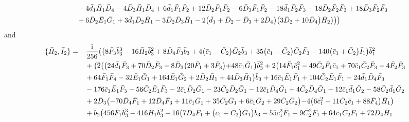 \documentclass[10pt]{amsart}
\theoremstyle{definition}
\theoremstyle{corollary}
\theoremstyle{remark}
\theoremstyle{conclusion}
\begin{document}
\begin{align}
& \hskip 0.7cm+4 \bar{d}_1 \bar{H}_1 \bar{D}_4-4 \bar{D}_3 \bar{H}_1 \bar{D}_4+6 \bar{d}_1 \bar{F}_1 \bar{F}_2+12 \bar{D}_2 \bar{F}_1 \bar{F}_2-6 \bar{D}_3 \bar{F}_1 \bar{F}_2-18 \bar{d}_1 \bar{F}_2 \bar{F}_3-18 \bar{D}_2 \bar{F}_2 \bar{F}_3+18 \bar{D}_3 \bar{F}_2 \bar{F}_3\nonumber \\
& \hskip 0.7cm+6 \bar{D}_2 \bar{E}_1 \bar{G}_1+3 \bar{d}_1 \bar{D}_2 \bar{H}_1-3 \bar{D}_2 \bar{D}_3 \bar{H}_1-2 \bigl(\bar{d}_1+\bar{D}_2-\bar{D}_3+2 \bar{D}_4\bigl) \bigl(3 \bar{D}_2+10 \bar{D}_4\bigl) \bar{H}_2\bigl)\bigl)\bigl)  
\end{align} and 
\begin{align}
\{\bar{H}_2, \bar{I}_2\}&=-\frac{\rm i}{256}  \bigl(\bigl(8 \bar{F}_3\bar{b}_3^3-16 \bar{H}_2 \bar{b}_3^2+8 \bar{D}_4 \bar{F}_3 \bar{b}_3+4 \bigl(\bar{c}_1-\bar{C}_2\bigl) \bar{G}_2 \bar{b}_3+35 \bigl(\bar{c}_1-\bar{C}_2\bigl) \bar{C}_2 \bar{F}_3-140 \bigl(\bar{c}_1+\bar{C}_2\bigl) \bar{I}_1\bigl) \bar{b}_1^2\nonumber \\
& \hskip 0.7cm+\bigl(\bar{2} \bigl(\bigl(24 \bar{d}_1 \bar{F}_3+70 \bar{D}_2 \bar{F}_3-8 \bar{D}_3 \bigl(20 \bar{F}_1+3 \bar{F}_3\bigl)+48 \bar{c}_1 \bar{G}_1\bigl) \bar{b}_3^2+2 \bigl(14 \bar{F}_1 \bar{c}_1^2-49 \bar{C}_2 \bar{F}_1 \bar{c}_1+70 \bar{c}_1\bar{C}_2 \bar{F}_3-4 \bar{F}_2 \bar{F}_3\nonumber \\
& \hskip 0.7cm +64 \bar{F}_1 \bar{F}_4-32 \bar{E}_1 \bar{G}_1+164 \bar{E}_1 \bar{G}_2+2 \bar{D}_2 \bar{H}_1+44 \bar{D}_3 \bar{H}_1\bigl) \bar{b}_3+16 \bar{c}_1 \bar{E}_1 \bar{F}_1+104 \bar{C}_2 \bar{E}_1 \bar{F}_1-24 \bar{d}_1 \bar{D}_4 \bar{F}_3\nonumber  \\
& \hskip 0.7cm -176 \bar{c}_1 \bar{E}_1 \bar{F}_3-56 \bar{C}_2 \bar{E}_1 \bar{F}_3-2 \bar{c}_1 \bar{D}_2 \bar{G}_1-23 \bar{C}_2 \bar{D}_2 \bar{G}_1-12 \bar{c}_1 \bar{D}_4 \bar{G}_1+4 \bar{C}_2 \bar{D}_4 \bar{G}_1-12 \bar{c}_1 \bar{d}_1 \bar{G}_2-58 \bar{C}_2 \bar{d}_1 \bar{G}_2\nonumber \\
& \hskip 0.7cm+2 \bar{D}_3 \bigl(-70 \bar{D}_4 \bar{F}_1+12 \bar{D}_4 \bar{F}_3+11 \bar{c}_1 \bar{G}_1+35 \bar{C}_2 \bar{G}_1+6 \bar{c}_1 \bar{G}_2+29 \bar{C}_2 \bar{G}_2\bigl)-4 \bigl(6 \bar{c}_1^2-11 \bar{C}_2 \bar{c}_1+88 \bar{F}_4\bigl) \bar{H}_1\bigl) \nonumber \\
& \hskip 0.7cm+\bar{b}_2 \bigl(456 \bar{F}_1 \bar{b}_3^3-416 \bar{H}_1 \bar{b}_3^2-16 \bigl(7 \bar{D}_4 \bar{F}_1+\bigl(\bar{c}_1-\bar{C}_2\bigl) \bar{G}_1\bigl) \bar{b}_3-55 \bar{c}_1^2 \bar{F}_1-9 \bar{C}_2^2 \bar{F}_1+64 \bar{c}_1 \bar{C}_2 \bar{F}_1+72 \bar{D}_4 \bar{H}_1\nonumber \\

\end{align}
\end{document}
